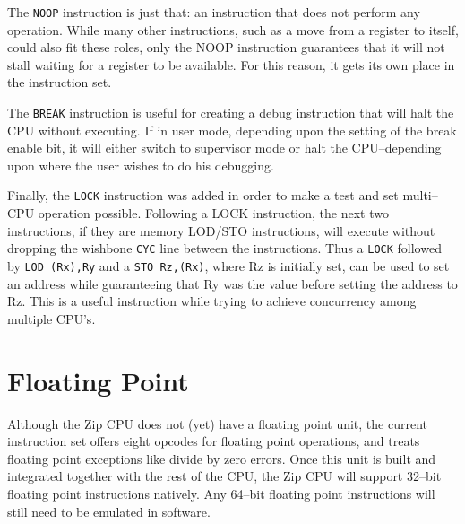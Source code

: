 \documentclass{gqtekspec}
\begin{document}
The {\tt NOOP} instruction is just that: an instruction that does not perform
any operation.  While many other instructions, such as a move from a register to
itself, could also fit these roles, only the NOOP instruction guarantees that
it will not stall waiting for a register to be available.   For this reason,
it gets its own place in the instruction set.

The {\tt BREAK} instruction is useful for creating a debug instruction that
will halt the CPU without executing.  If in user mode, depending upon the
setting of the break enable bit, it will either switch to supervisor mode or
halt the CPU--depending upon where the user wishes to do his debugging.

Finally, the {\tt LOCK} instruction was added in order to make a test and
set multi--CPU operation possible.  Following a LOCK instruction, the next
two instructions, if they are memory LOD/STO instructions, will execute without
dropping the wishbone {\tt CYC} line between the instructions.   Thus a 
{\tt LOCK} followed by {\tt LOD (Rx),Ry} and a {\tt STO Rz,(Rx)}, where Rz
is initially set, can be used to set an address while guaranteeing that Ry
was the value before setting the address to Rz.   This is a useful instruction
while trying to achieve concurrency among multiple CPU's.

\section{Floating Point}
Although the Zip CPU does not (yet) have a floating point unit, the current
instruction set offers eight opcodes for floating point operations, and treats
floating point exceptions like divide by zero errors.  Once this unit is built
and integrated together with the rest of the CPU, the Zip CPU will support
32--bit floating point instructions natively.  Any 64--bit floating point
instructions will still need to be emulated in software.
\end{document}
